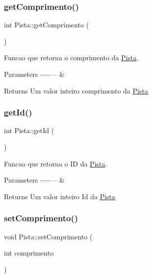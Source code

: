 \subsubsection{\texorpdfstring{get\+Comprimento()}{getComprimento()}}
{\footnotesize\ttfamily int Pista\+::get\+Comprimento (\begin{DoxyParamCaption}{ }\end{DoxyParamCaption})}



Funcao que retorna o comprimento da \hyperlink{classPista}{Pista}. 


\begin{DoxyParams}{Parameters}
{\em -\/-\/-\/-\/---} & \\
\hline
\end{DoxyParams}
\begin{DoxyReturn}{Returns}
Um valor inteiro comprimento da \hyperlink{classPista}{Pista} 
\end{DoxyReturn}
\mbox{\label{classPista_ac3e4ec4a2cc6a70a48244a4875fd7633}} 
\subsubsection{\texorpdfstring{get\+Id()}{getId()}}
{\footnotesize\ttfamily int Pista\+::get\+Id (\begin{DoxyParamCaption}{ }\end{DoxyParamCaption})}



Funcao que retorna o ID da \hyperlink{classPista}{Pista}. 


\begin{DoxyParams}{Parameters}
{\em -\/-\/-\/-\/---} & \\
\hline
\end{DoxyParams}
\begin{DoxyReturn}{Returns}
Um valor inteiro Id da \hyperlink{classPista}{Pista} 
\end{DoxyReturn}
\mbox{\label{classPista_a7ad4b55d2be608f021fd46ece3ce6d91}} 
\subsubsection{\texorpdfstring{set\+Comprimento()}{setComprimento()}}
{\footnotesize\ttfamily void Pista\+::set\+Comprimento (\begin{DoxyParamCaption}\item[{int}]{comprimento }\end{DoxyParamCaption})}



